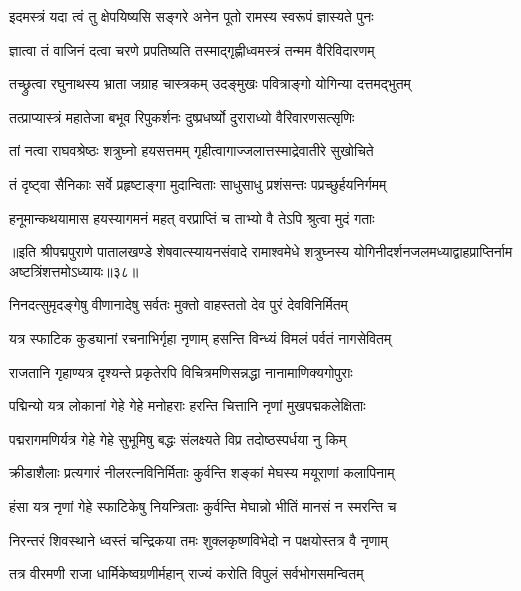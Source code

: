 \twolineshloka
{इदमस्त्रं यदा त्वं तु क्षेपयिष्यसि सङ्गरे}
{अनेन पूतो रामस्य स्वरूपं ज्ञास्यते पुनः}%

\twolineshloka
{ज्ञात्वा तं वाजिनं दत्वा चरणे प्रपतिष्यति}
{तस्माद्गृह्णीध्वमस्त्रं तन्मम वैरिविदारणम्}%

\twolineshloka
{तच्छ्रुत्वा रघुनाथस्य भ्राता जग्राह चास्त्रकम्}
{उदङ्मुखः पवित्राङ्गो योगिन्या दत्तमद्भुतम्}%

\twolineshloka
{तत्प्राप्यास्त्रं महातेजा बभूव रिपुकर्शनः}
{दुष्प्रधर्ष्यो दुराराध्यो वैरिवारणसत्सृणिः}%

\twolineshloka
{तां नत्वा राघवश्रेष्ठः शत्रुघ्नो हयसत्तमम्}
{गृहीत्वागाज्जलात्तस्माद्रेवातीरे सुखोचिते}%

\twolineshloka
{तं दृष्ट्वा सैनिकाः सर्वे प्रहृष्टाङ्गा मुदान्विताः}
{साधुसाधु प्रशंसन्तः पप्रच्छुर्हयनिर्गमम्}%

\twolineshloka
{हनूमान्कथयामास हयस्यागमनं महत्}
{वरप्राप्तिं च ताभ्यो वै तेऽपि श्रुत्वा मुदं गताः}%

॥इति श्रीपद्मपुराणे पातालखण्डे शेषवात्स्यायनसंवादे रामाश्वमेधे शत्रुघ्नस्य योगिनीदर्शनजलमध्याद्वाहप्राप्तिर्नाम अष्टत्रिंशत्तमोऽध्यायः॥३८॥



\twolineshloka
{निनदत्सुमृदङ्गेषु वीणानादेषु सर्वतः}
{मुक्तो वाहस्ततो देव पुरं देवविनिर्मितम्}%

\twolineshloka
{यत्र स्फाटिक कुड्यानां रचनाभिर्गृहा नृणाम्}
{हसन्ति विन्ध्यं विमलं पर्वतं नागसेवितम्}%

\twolineshloka
{राजतानि गृहाण्यत्र दृश्यन्ते प्रकृतेरपि}
{विचित्रमणिसन्नद्धा नानामाणिक्यगोपुराः}%

\twolineshloka
{पद्मिन्यो यत्र लोकानां गेहे गेहे मनोहराः}
{हरन्ति चित्तानि नृणां मुखपद्मकलेक्षिताः}%

\twolineshloka
{पद्मरागमणिर्यत्र गेहे गेहे सुभूमिषु}
{बद्धः संलक्ष्यते विप्र तदोष्ठस्पर्धया नु किम्}%

\twolineshloka
{क्रीडाशैलाः प्रत्यगारं नीलरत्नविनिर्मिताः}
{कुर्वन्ति शङ्कां मेघस्य मयूराणां कलापिनाम्}%

\twolineshloka
{हंसा यत्र नृणां गेहे स्फाटिकेषु नियन्त्रिताः}
{कुर्वन्ति मेघान्नो भीतिं मानसं न स्मरन्ति च}%

\twolineshloka
{निरन्तरं शिवस्थाने ध्वस्तं चन्द्रिकया तमः}
{शुक्लकृष्णविभेदो न पक्षयोस्तत्र वै नृणाम्}%

\twolineshloka
{तत्र वीरमणी राजा धार्मिकेष्वग्रणीर्महान्}
{राज्यं करोति विपुलं सर्वभोगसमन्वितम्}%

